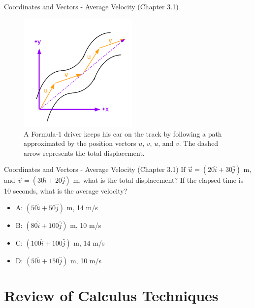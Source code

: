 \documentclass{beamer}
\begin{document}
\begin{frame}{Coordinates and Vectors - Average Velocity (Chapter 3.1)}
\begin{figure}
\centering
\includegraphics[width=0.52\textwidth]{figures/AveVelocity.pdf}
\caption{\label{fig:avevel} A Formula-1 driver keeps his car on the track by following a path approximated by the position vectors $u$, $v$, $u$, and $v$.  The dashed arrow represents the total displacement.}
\end{figure}
\end{frame}

\begin{frame}{Coordinates and Vectors - Average Velocity (Chapter 3.1)}
If $\vec{u} = (20\hat{i}+30\hat{j})$ m, and $\vec{v} = (30\hat{i}+20\hat{j})$ m, what is the total displacement?  If the elapsed time is 10 seconds, what is the average velocity? \\
\vspace{0.2cm}
\begin{itemize}
\item A: $(50\hat{i} + 50\hat{j})$ m, 14 m/s
\item B: $(80\hat{i} + 100\hat{j})$ m, 10 m/s
\item C: $(100\hat{i} + 100\hat{j})$ m, 14 m/s
\item D: $(50\hat{i} + 150\hat{j})$ m, 10 m/s
\end{itemize}
\end{frame}

\section{Review of Calculus Techniques}
\end{document}
